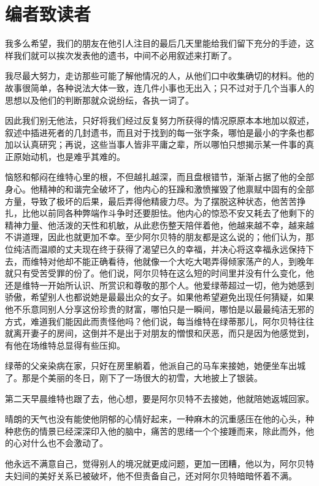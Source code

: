 \documentclass[12pt,oneside]{book}
\begin{document}
\part{编者致读者}
\begin{framed}
我多么希望，我们的朋友在他引人注目的最后几天里能给我们留下充分的手迹，这样我们就可以挨次发表他的遗书，中间不必用叙述来打断了。

我尽最大努力，走访那些可能了解他情况的人，从他们口中收集确切的材料。他的故事很简单，各种说法大体一致，连几件小事也无出入；只不过对于几个当事人的思想以及他们的判断那就众说纷纭，各执一词了。

因此我们别无他法，只好将我们经过反复努力所获得的情况原原本本地加以叙述，叙述中插进死者的几封遗书，而且对于找到的每一张字条，哪怕是最小的字条也都加以认真研究；再说，这些当事人皆非平庸之辈，所以哪怕只想揭示某一件事的真正原始动机，也是难乎其难的。

恼怒和郁闷在维特心里的根，不但越扎越深，而且盘根错节，渐渐占据了他的全部身心。他精神的和谐完全破坏了，他内心的狂躁和激愤摧毁了他禀赋中固有的全部方量，导致了极坏的后果，最后弄得他精疲力尽。为了摆脱这种状态，他苦苦挣扎，比他以前同各种弊端作斗争时还要胆怯。他内心的惊恐不安又耗去了他剩下的精神力量、他活泼的天性和机敏，从此悲伤整天陪伴着他，他越来越不幸，越来越不讲道理，因此也就更加不幸。至少阿尔贝特的朋友都是这么说的；他们认为，那位纯洁而温顺的丈夫现在终于获得了渴望已久的幸福，并决心将这幸福永远保持下去，而维特对他却不能正确看待，他就像一个大吃大喝弄得倾家荡产的人，到晚年就只有受苦受罪的份了。他们说，阿尔贝特在这么短的时间里并没有什么变化，他还是维特一开始所认识、所赏识和尊敬的那个人。他爱绿蒂超过一切，他为她感到骄傲，希望别人也都说她是最最出众的女子。如果他希望避免出现任何猜疑，如果他不乐意同别人分享这份珍贵的财富，哪怕只是一瞬间，哪怕是以最最纯洁无邪的方式，难道我们能因此而责怪他吗？他们说，每当维特在绿蒂那儿，阿尔贝特往往就离开妻子的房间，这倒并不是出于对朋友的憎恨和厌恶，而只是因为他感觉到，有他在场维特总显得有些压抑。

绿蒂的父亲染病在家，只好在房里躺着，他派自己的马车来接她，她便坐车出城了。那是个美丽的冬日，刚下了一场很大的初雪，大地披上了银装。

第二天早晨维特也跟了去，他心想，要是阿尔贝特不去接她，他就陪她返城回家。

晴朗的天气也没有能使他阴郁的心情好起来，一种麻木的沉重感压在他的心头，种种悲伤的情景已经深深印入他的脑中，痛苦的思绪一个个接踵而来，除此而外，他的心对什么也不会激动了。

他永远不满意自己，觉得别人的境况就更成问题，更加一团糟，他以为，阿尔贝特夫妇间的美好关系已被破坏，他不但责备自己，还对阿尔贝特暗暗怀着不满。


\end{framed}
\end{document}
